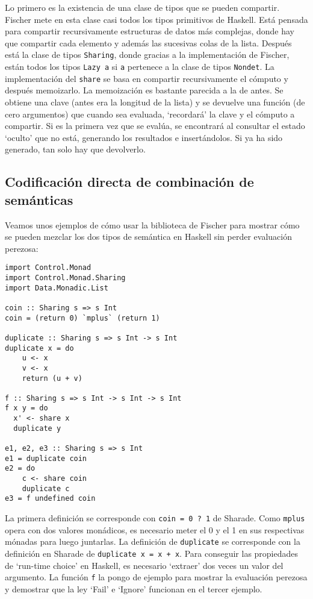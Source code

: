 \documentclass[class=article, crop=false]{standalone}
\begin{document}
Lo primero es la existencia de una clase de tipos que se pueden compartir. Fischer mete en
esta clase casi todos los tipos primitivos de Haskell. Está pensada para compartir
recursivamente estructuras de datos más complejas, donde hay que compartir cada elemento y
además las sucesivas colas de la lista. Después está la clase de tipos \verb`Sharing`, donde
gracias a la implementación de Fischer, están todos los tipos \verb`Lazy a` si \verb`a`
pertenece a la clase de tipos \verb`Nondet`. La implementación del \verb`share` se basa en
compartir recursivamente el cómputo y después memoizarlo. La memoización es bastante parecida
a la de antes. Se obtiene una clave (antes era la longitud de la lista) y se devuelve una
función (de cero argumentos) que cuando sea evaluada, `recordará' la clave y el cómputo a
compartir. Si es la primera vez que se evalúa, se encontrará al consultar el estado `oculto'
que no está, generando los resultados e insertándolos. Si ya ha sido generado, tan solo hay
que devolverlo.

\subsection{Codificación directa de combinación de semánticas}\label{sec:uso_directo}
Veamos unos ejemplos de cómo usar la biblioteca de Fischer para mostrar cómo se pueden
mezclar los dos tipos de semántica en Haskell sin perder evaluación perezosa:

\begin{verbatim}
import Control.Monad
import Control.Monad.Sharing
import Data.Monadic.List

coin :: Sharing s => s Int
coin = (return 0) `mplus` (return 1)

duplicate :: Sharing s => s Int -> s Int
duplicate x = do
    u <- x
    v <- x
    return (u + v)

f :: Sharing s => s Int -> s Int -> s Int
f x y = do
  x' <- share x
  duplicate y

e1, e2, e3 :: Sharing s => s Int
e1 = duplicate coin
e2 = do
    c <- share coin
    duplicate c
e3 = f undefined coin  
\end{verbatim}

La primera definición se corresponde con \verb`coin = 0 ? 1` de Sharade. Como \verb`mplus`
opera con dos valores monádicos, es necesario meter el 0 y el 1 en sus respectivas mónadas
para luego juntarlas. La definición de \verb`duplicate` se corresponde con la definición en
Sharade de \verb`duplicate x = x + x`. Para conseguir las propiedades de `run-time choice' en
Haskell, es necesario `extraer' dos veces un valor del argumento. La función \verb`f` la
pongo de ejemplo para mostrar la evaluación perezosa y demostrar que la ley `Fail' e `Ignore'
funcionan en el tercer ejemplo.
\end{document}
